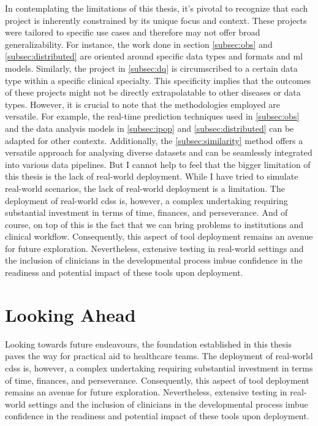 In contemplating the limitations of this thesis, it's pivotal to recognize that each project is inherently constrained by its unique focus and context. These projects were tailored to specific use cases and therefore may not offer broad generalizability. For instance, the work done in section \ref{subsec:obs} and \ref{subsec:distributed} are oriented around specific data types and formats and \ac{ml} models. Similarly, the project in \ref{subsec:dq} is circumscribed to a certain data type within a specific clinical specialty. This specificity implies that the outcomes of these projects might not be directly extrapolatable to other diseases or data types. However, it is crucial to note that the methodologies employed are versatile. For example, the real-time prediction techniques used in \ref{subsec:obs} and the data analysis models in \ref{subsec:ipop} and \ref{subsec:distributed} can be adapted for other contexts. Additionally, the \ref{subsec:similarity} method offers a versatile approach for analysing diverse datasets and can be seamlessly integrated into various data pipelines.
But I cannot help to feel that the bigger limitation of this thesis is the lack of real-world deployment. While I have tried to simulate real-world scenarios, the lack of real-world deployment is a limitation. The deployment of real-world \ac{cdss} is, however, a complex undertaking requiring substantial investment in terms of time, finances, and perseverance. And of course, on top of this is the fact that we can bring problems to institutions and clinical workflow. Consequently, this aspect of tool deployment remains an avenue for future exploration. Nevertheless, extensive testing in real-world settings and the inclusion of clinicians in the developmental process imbue confidence in the readiness and potential impact of these tools upon deployment.



\section{Looking Ahead}

Looking towards future endeavours, the foundation established in this thesis paves the way for practical aid to healthcare teams. The deployment of real-world \ac{cdss} is, however, a complex undertaking requiring substantial investment in terms of time, finances, and perseverance. Consequently, this aspect of tool deployment remains an avenue for future exploration. Nevertheless, extensive testing in real-world settings and the inclusion of clinicians in the developmental process imbue confidence in the readiness and potential impact of these tools upon deployment.


